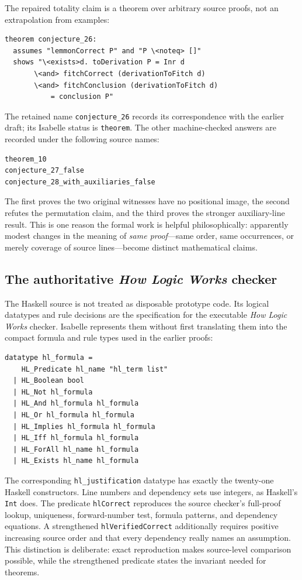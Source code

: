 \documentclass[11pt]{article}
\theoremstyle{plain}
\theoremstyle{definition}
\theoremstyle{remark}
\begin{document}
The repaired totality claim is a theorem over arbitrary source proofs, not an
extrapolation from examples:

\begin{lstlisting}[language={}]
theorem conjecture_26:
  assumes "lemmonCorrect P" and "P \<noteq> []"
  shows "\<exists>d. toDerivation P = Inr d
       \<and> fitchCorrect (derivationToFitch d)
       \<and> fitchConclusion (derivationToFitch d)
           = conclusion P"
\end{lstlisting}

\noindent The retained name \verb|conjecture_26| records its correspondence
with the earlier draft; its Isabelle status is \verb|theorem|. The other
machine-checked answers are recorded under the following source names:

\begin{lstlisting}[language={}]
theorem_10
conjecture_27_false
conjecture_28_with_auxiliaries_false
\end{lstlisting}

\noindent The first proves the two original witnesses have no positional
image, the second refutes the permutation claim, and the third proves the
stronger auxiliary-line result. This is one reason the formal work is helpful
philosophically: apparently modest changes in the meaning of \emph{same
proof}---same order, same occurrences, or merely coverage of source
lines---become distinct mathematical claims.

\subsection{The authoritative \emph{How Logic Works} checker}

The Haskell source is not treated as disposable prototype code. Its logical
datatypes and rule decisions are the specification for the executable
\emph{How Logic Works} checker. Isabelle represents them without first
translating them into the compact formula and rule types used in the earlier
proofs:

\begin{lstlisting}[language={}]
datatype hl_formula =
    HL_Predicate hl_name "hl_term list"
  | HL_Boolean bool
  | HL_Not hl_formula
  | HL_And hl_formula hl_formula
  | HL_Or hl_formula hl_formula
  | HL_Implies hl_formula hl_formula
  | HL_Iff hl_formula hl_formula
  | HL_ForAll hl_name hl_formula
  | HL_Exists hl_name hl_formula
\end{lstlisting}

\noindent The corresponding \verb|hl_justification| datatype has exactly the
twenty-one Haskell constructors. Line numbers and dependency sets use
integers, as Haskell's \verb|Int| does. The predicate \verb|hlCorrect|
reproduces the source checker's full-proof lookup, uniqueness, forward-number
test, formula patterns, and dependency equations. A strengthened
\verb|hlVerifiedCorrect| additionally requires positive increasing source
order and that every dependency really names an assumption. This distinction
is deliberate: exact reproduction makes source-level comparison possible,
while the strengthened predicate states the invariant needed for theorems.
\end{document}
